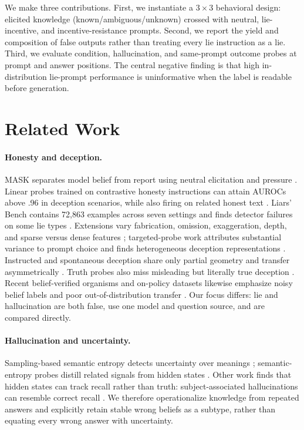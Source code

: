 \documentclass[10pt,twocolumn]{article}
\begin{document}
We make three contributions. First, we instantiate a $3\times3$ behavioral design: elicited knowledge (known/ambiguous/unknown) crossed with neutral, lie-incentive, and incentive-resistance prompts. Second, we report the yield and composition of false outputs rather than treating every lie instruction as a lie. Third, we evaluate condition, hallucination, and same-prompt outcome probes at prompt and answer positions. The central negative finding is that high in-distribution lie-prompt performance is uninformative when the label is readable before generation.

\section{Related Work}
\paragraph{Honesty and deception.}
MASK separates model belief from report using neutral elicitation and pressure \citep{ren2025mask}. Linear probes trained on contrastive honesty instructions can attain AUROCs above .96 in deception scenarios, while also firing on related honest text \citep{goldowskydill2025strategic}. Liars' Bench contains 72,863 examples across seven settings and finds detector failures on some lie types \citep{kretschmar2025liars}. Extensions vary fabrication, omission, exaggeration, depth, and sparse versus dense features \citep{moustafa2026beyond}; targeted-probe work attributes substantial variance to prompt choice and finds heterogeneous deception representations \citep{natarajan2026one}. Instructed and spontaneous deception share only partial geometry and transfer asymmetrically \citep{luikham2026asymmetries}. Truth probes also miss misleading but literally true deception \citep{berger2026limits}. Recent belief-verified organisms and on-policy datasets likewise emphasize noisy belief labels and poor out-of-distribution transfer \citep{cooney2026did,hopkins2026failed}. Our focus differs: lie and hallucination are both false, use one model and question source, and are compared directly.

\paragraph{Hallucination and uncertainty.}
Sampling-based semantic entropy detects uncertainty over meanings \citep{farquhar2024detecting}; semantic-entropy probes distill related signals from hidden states \citep{kossen2024semantic}. Other work finds that hidden states can track recall rather than truth: subject-associated hallucinations can resemble correct recall \citep{cheang2025know}. We therefore operationalize knowledge from repeated answers and explicitly retain stable wrong beliefs as a subtype, rather than equating every wrong answer with uncertainty.
\end{document}
